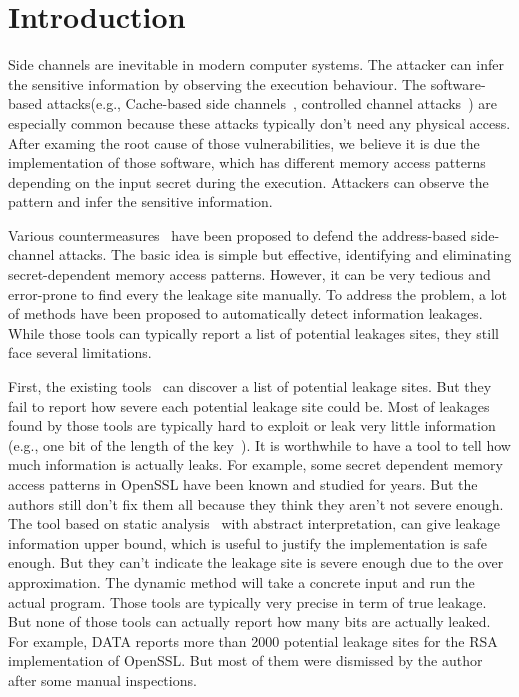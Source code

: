 \section{Introduction}

Side channels are inevitable in modern computer systems. The attacker can infer the sensitive 
information by observing the execution behaviour. The software-based attacks(e.g., Cache-based 
side channels~\cite{184415,191010,7163050,Osvik:2006:CAC:2117739.2117741}, 
controlled channel attacks~\cite{7163052}) 
are especially common because these attacks typically don't need any physical access. 
After examing the root cause of those vulnerabilities, we believe it is due the implementation 
of those software, which has different memory access patterns depending on the input secret 
during the execution. Attackers can observe the pattern and infer the sensitive information.

Various countermeasures~\cite{182946,203878,217537} have been proposed to defend the 
address-based side-channel attacks. The basic idea is simple but effective, identifying 
and eliminating secret-dependent memory access patterns. 
However, it can be very tedious and error-prone to find every the leakage site manually. 
To address the problem, a lot of methods have been proposed to automatically detect information leakages. 
While those tools can typically report a list of potential leakages sites, they still 
face several limitations.

First, the existing tools~\cite{203878, 217537} can discover a list of potential leakage sites. 
But they fail to report how severe each potential leakage site could be. Most of leakages 
found by those tools are typically hard to exploit or leak very little information (e.g., one bit of
the length of the key~\cite{203878}).  
It is worthwhile to have a tool to tell how much information is actually leaks. 
For example, some secret dependent memory access patterns in OpenSSL have been known 
and studied for years. But the authors still don't fix them all because they think 
they aren’t not severe enough. The tool based on static analysis~\cite{182946} with 
abstract interpretation, can give leakage information upper bound, which is useful to 
justify the implementation is safe enough. But they can’t indicate the leakage site 
is severe enough due to the over approximation. The dynamic method will take a concrete 
input and run the actual program. 
Those tools are typically very precise in term of true leakage. But none of those tools 
can actually report how many bits are actually leaked. For example, DATA\cite{217537} reports more 
than 2000 potential leakage sites for the RSA implementation of OpenSSL. But most of 
them were dismissed by the author after some manual inspections.

